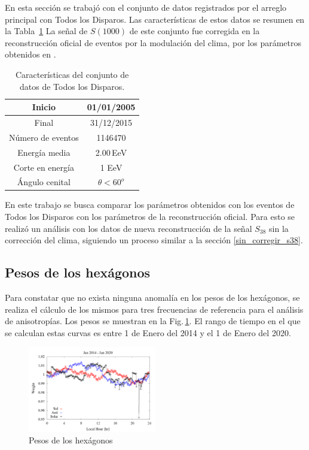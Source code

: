 
En esta sección se trabajó con el conjunto de datos registrados por el arreglo principal con Todos los Disparos. Las características de estos datos se resumen en la Tabla~\ref{tabla:caracteristicas_ALL} La señal de $S(1000)$ de este conjunto fue corregida en la reconstrucción oficial de eventos por la modulación del clima, por los parámetros obtenidos en \cite{aab2017impact}.


\begin{table}[H]
  \centering
  \begin{tabular}{|c|c|}
  \hline
  Inicio              & 01/01/2005 \\ \hline
  Final               & 31/12/2015       							\\ \hline
  Número de eventos   & 1146470							\\ \hline 
  Energía media       & 2.00\,EeV       				\\ \hline  %
  Corte en energía    & 1 EeV        				\\ \hline 
  Ángulo cenital		& $\theta < 60^o$ 				\\ \hline
  \end{tabular}
\caption{Características del conjunto de datos de Todos los Disparos.} \label{tabla:caracteristicas_ALL}
\end{table}

En este trabajo se busca comparar los parámetros obtenidos con los eventos de Todos los Disparos con los parámetros de la reconstrucción oficial. Para esto se realizó un análisis con los datos de nueva reconstrucción de la señal $S_{38}$ sin la corrección del clima, siguiendo un proceso similar a la sección \ref{sin_corregir_s38}.

\subsection{Pesos de los hexágonos}

Para constatar que no exista ninguna anomalía en los pesos de los hexágonos, se realiza el cálculo de los mismos para tres frecuencias de referencia para el análisis de anisotropías.  Los pesos se muestran en la Fig.\,\ref{fig:wei_14_20}. El rango de tiempo en el que se calculan estas curvas es entre 1 de Enero del 2014 y el 1 de Enero del 2020.

\begin{figure}[H]
	\centering
	\includegraphics[width=0.5\textwidth]{weigth2014-2020_jan.png} 	
	\caption{Pesos de los hexágonos}
	\label{fig:wei_14_20}
\end{figure}

